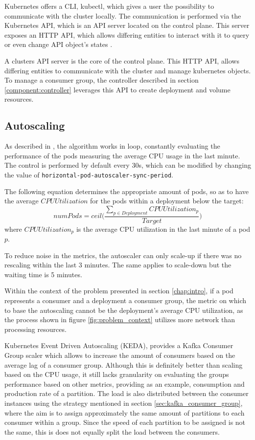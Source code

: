 Kubernetes offers a CLI, kubectl, which gives a user the possibility to
communicate with the cluster locally. The communication is performed via the
Kubernetes API, which is an API server located on the control plane. This server
exposes an HTTP API, which allows differing entities to interact with it to
query or even change API object's states \cite{KubernetesAPI}.

A clusters API server is the core of the control plane. This HTTP API, allows
differing entities to communicate with the cluster and manage kubernetes
objects. To manage a consumer group, the controller described in section
\ref{component:controller} leverages this API to create deployment and volume
resources.

\subsection{Autoscaling}

As described in \cite{KubernetesAutoscaling}, the algorithm works in loop,
constantly evaluating the performance of the pods measuring the average CPU
usage in the last minute. The control is performed by default every 30s, which
can be modified by changing the value of
\lstinline{horizontal-pod-autoscaler-sync-period}.

The following equation determines the appropriate amount of pods, so as to have
the average $CPUUtilization$ for the pods within a deployment below the target:
\begin{equation}
    numPods = ceil\bigg(\frac
        {\sum_{p \in Deployment} CPUUtilization_p}
        {Target}
    \bigg)
\end{equation}
where $CPUUtilization_p$ is the average CPU utilization in the last minute of a
pod $p$. 

To reduce noise in the metrics, the autoscaler can only scale-up if there was no
rescaling within the last 3 minutes. The same applies to scale-down but the
waiting time is 5 minutes.

Within the context of the problem presented in section \ref{chap:intro}, if a
pod represents a consumer and a deployment a consumer group, the metric on
which to base the autoscaling cannot be the deployment's average CPU
utilization, as the process shown in figure \ref{fig:problem_context} utilizes
more network than processing resources. 

Kubernetes Event Driven Autoscaling (KEDA), provides a Kafka Consumer Group
scaler which allows to increase the amount of consumers based on the average lag
of a consumer group. Although this is definitely better than scaling based on
the CPU usage, it still lacks granularity on evaluating the groups performance
based on other metrics, providing as an example, consumption and production rate
of a partition. The load is also distributed between the consumer instances
using the strategy mentioned in section \ref{sec:kafka_consumer_group}, where
the aim is to assign approximately the same amount of partitions to each
consumer within a group. Since the speed of each partition to be assigned is not
the same, this is does not equally split the load between the consumers.


